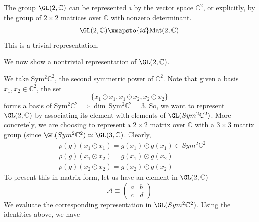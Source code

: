   \begin{example}
    \label{ex:representations-of-gl2c}
    The group $\GL(2, \mathbb{C})$ can be represented a by the \hyperref[def:vector-space]{vector space} $\mathbb{C}^2$, or explicitly, by the group of $2 \times 2$ matrices over $\mathbb{C}$ with nonzero determinant.
    \begin{equation}
      \GL(2, \mathbb{C}) \xmapsto{id} \text{Mat}(2, \mathbb{C})
    \end{equation}
    This is a trivial representation. 
  \end{example}

  We now show a nontrivial representation of $\GL(2, \mathbb{C})$. 

  \begin{example}
    \label{ex:the-second-symmetric-power-sym2c2}
    We take Sym$^2 \mathbb{C}^2$, the second symmetric power of $\mathbb{C}^2$. Note that given a basis $x_1, x_2 \in \mathbb{C}^2$, the set
    \begin{equation}
      \{x_1 \odot x_1, x_1 \odot x_2, x_2 \odot x_2\}
    \end{equation}
    forms a basis of Sym$^2 \mathbb{C}^2 \implies \dim\,$Sym$^2 \mathbb{C}^2 = 3$. So, we want to represent $\GL(2, \mathbb{C})$ by associating its element with elements of $\GL(Sym^2 \mathbb{C}^2)$. More concretely, we are choosing to represent a $2 \times 2$ matrix over $\mathbb{C}$ with a $3 \times 3$ matrix group (since $\GL(Sym^2 \mathbb{C}^2) \simeq \GL(3, \mathbb{C})$. Clearly,
    \begin{align*}
      & \rho(g) (x_1 \odot x_1) = g(x_1) \odot g(x_1) \in Sym^2 \mathbb{C}^2 \\
      & \rho(g) (x_1 \odot x_2) = g(x_1) \odot g(x_2) \\
      & \rho(g) (x_2 \odot x_2) = g(x_2) \odot g(x_2)
    \end{align*}
    To present this in matrix form, let us have an element in $\GL (2, \mathbb{C})$
    \begin{equation}
      \mathcal{A} \equiv \begin{pmatrix}
      a & b \\
      c & d
      \end{pmatrix}
    \end{equation}
    We evaluate the corresponding representation in $\GL( Sym^2 \mathbb{C}^2)$. Using the identities above, we have 
    \begin{align*}

\end{align*}
\end{example}
